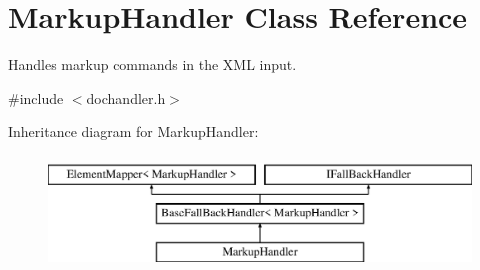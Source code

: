 \hypertarget{class_markup_handler}{}\section{Markup\+Handler Class Reference}
\label{class_markup_handler}


Handles markup commands in the X\+ML input.  




{\ttfamily \#include $<$dochandler.\+h$>$}

Inheritance diagram for Markup\+Handler\+:\begin{figure}[H]
\begin{center}
\leavevmode
\includegraphics[height=3.000000cm]{class_markup_handler}
\end{center}
\end{figure}
